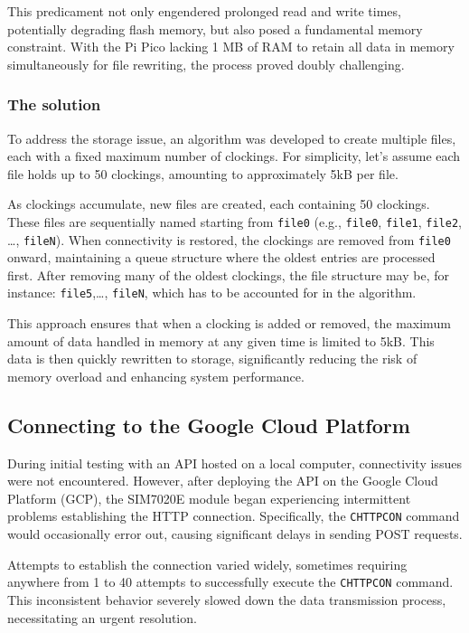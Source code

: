 This predicament not only engendered prolonged read and write times, potentially degrading flash 
memory, but also posed a fundamental memory constraint. With the Pi Pico lacking 1 MB of RAM to 
retain all data in memory simultaneously for file rewriting, the process proved doubly challenging.

\subsubsection*{The solution}

To address the storage issue, an algorithm was developed to create multiple files, each with a 
fixed maximum number of clockings. For simplicity, let's assume each file holds up to 50 
clockings, amounting to approximately 5kB per file.

As clockings accumulate, new files are created, each containing 50 clockings. These files are 
sequentially named starting from \texttt{file0} (e.g., \texttt{file0}, \texttt{file1}, 
\texttt{file2},\\\dots, \texttt{fileN}). When connectivity is restored, the clockings are removed 
from \texttt{file0} onward, maintaining a queue structure where the oldest entries are processed 
first. After removing many of the oldest clockings, the file structure may be, for instance: 
\texttt{file5},\dots, \texttt{fileN}, which has to be accounted for in the algorithm.

This approach ensures that when a clocking is added or removed, the maximum amount of data handled 
in memory at any given time is limited to 5kB. This data is then quickly rewritten to storage, 
significantly reducing the risk of memory overload and enhancing system performance.


\subsection{Connecting to the Google Cloud Platform}

During initial testing with an API hosted on a local computer, connectivity issues were not 
encountered. However, after deploying the API on the Google Cloud Platform (GCP), the SIM7020E 
module began experiencing intermittent problems establishing the HTTP connection. Specifically, the 
\texttt{CHTTPCON} command would occasionally error out, causing significant delays in sending POST 
requests.

Attempts to establish the connection varied widely, sometimes requiring anywhere from 1 to 40 
attempts to successfully execute the \texttt{CHTTPCON} command. This inconsistent behavior severely 
slowed down the data transmission process, necessitating an urgent resolution.

